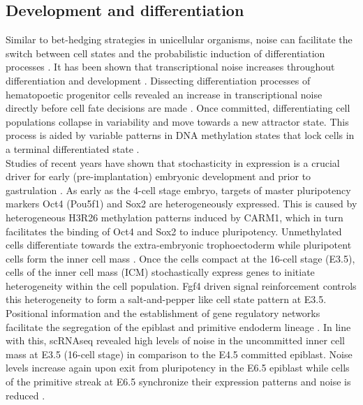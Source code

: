 \subsection{Development and differentiation}

Similar to bet-hedging strategies in unicellular organisms, noise can facilitate the switch between cell states and the probabilistic induction of differentiation processes \citep{Eldar2010, Chang2008}. It has been shown that transcriptional noise increases throughout differentiation \citep{Stumpf2017} and development \citep{Antolovic2017}. Dissecting differentiation processes of hematopoetic progenitor cells revealed an increase in transcriptional noise directly before cell fate decisions are made \citep{Mojtahedi2016, Richard2016}. Once committed, differentiating cell populations collapse in variability and move towards a new attractor state. This process is aided by variable patterns in DNA methylation states that lock cells in a terminal differentiated state \citep{Jenkinson2017}. \\

Studies of recent years have shown that stochasticity in expression is a crucial driver for early (pre-implantation) embryonic development and prior to gastrulation \citep{Dietrich2007}. As early as the 4-cell stage embryo, targets of master pluripotency markers Oct4 (Pou5f1) and Sox2 are heterogeneously expressed.  This is caused by heterogeneous H3R26 methylation patterns induced by CARM1, which in turn facilitates the binding of Oct4 and Sox2 to induce pluripotency. Unmethylated cells differentiate towards the extra-embryonic trophoectoderm while pluripotent cells form the inner cell mass \citep{Goolam2016}. Once the cells compact at the 16-cell stage (E3.5), cells of the inner cell mass (ICM) stochastically express genes to initiate heterogeneity within the cell population. Fgf4 driven signal reinforcement controls this heterogeneity to form a salt-and-pepper like cell state pattern at E3.5. Positional information and the establishment of gene regulatory networks facilitate the segregation of the epiblast and primitive endoderm lineage \citep{Ohnishi2014}. In line with this, scRNAseq revealed high levels of noise in the uncommitted inner cell mass at E3.5 (16-cell stage) in comparison to the E4.5 committed epiblast. Noise levels increase again upon exit from pluripotency in the E6.5 epiblast while cells of the primitive streak at E6.5 synchronize their expression patterns and noise is reduced \citep{Mohammed2017}.\\

